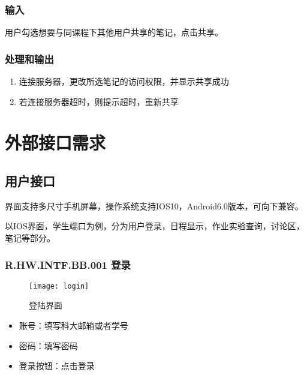     \subsubsection{输入}
	   用户勾选想要与同课程下其他用户共享的笔记，点击共享。
    \subsubsection{处理和输出}
    \begin{enumerate}
      \item 连接服务器，更改所选笔记的访问权限，并显示共享成功
      \item 若连接服务器超时，则提示超时，重新共享
    \end{enumerate}

\section{外部接口需求}
  \subsection{用户接口}
  界面支持多尺寸手机屏幕，操作系统支持IOS10，Android6.0版本，可向下兼容。\par
  以IOS界面，学生端口为例，分为用户登录，日程显示，作业实验查询，讨论区，笔记等部分。
    \subsubsection{R.HW.INTF.BB.001 登录}
    \begin{figure}[H]
    \centering
    \texttt{[image: login]}
    \caption{登陆界面}
    \end{figure}
    \begin{itemize}
      \item 账号：填写科大邮箱或者学号
      \item 密码：填写密码
      \item 登录按钮：点击登录
    \end{itemize}

